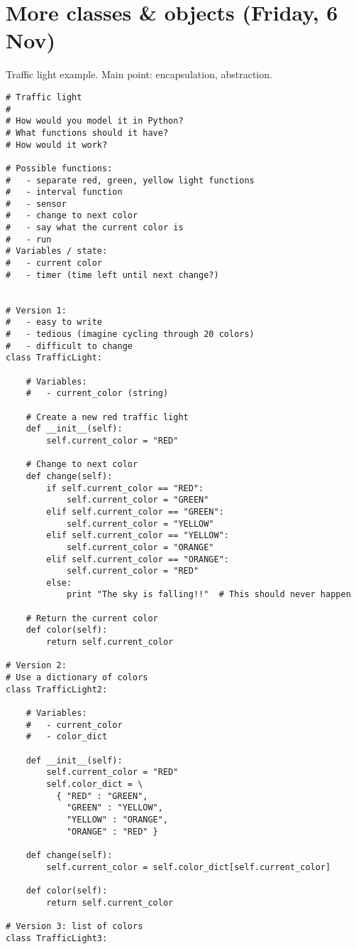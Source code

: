 \documentclass{article}
\begin{document}
\section*{More classes \& objects (Friday, 6 Nov)}

Traffic light example.  Main point: encapsulation, abstraction.

\begin{verbatim}
# Traffic light
#
# How would you model it in Python?
# What functions should it have?
# How would it work?

# Possible functions:
#   - separate red, green, yellow light functions
#   - interval function
#   - sensor
#   - change to next color
#   - say what the current color is
#   - run
# Variables / state:
#   - current color
#   - timer (time left until next change?)


# Version 1:
#   - easy to write
#   - tedious (imagine cycling through 20 colors)
#   - difficult to change
class TrafficLight:

    # Variables:
    #   - current_color (string)

    # Create a new red traffic light
    def __init__(self):
        self.current_color = "RED"

    # Change to next color
    def change(self):
        if self.current_color == "RED":
            self.current_color = "GREEN"
        elif self.current_color == "GREEN":
            self.current_color = "YELLOW"
        elif self.current_color == "YELLOW":
            self.current_color = "ORANGE"
        elif self.current_color == "ORANGE":
            self.current_color = "RED"
        else:
            print "The sky is falling!!"  # This should never happen

    # Return the current color
    def color(self):
        return self.current_color

# Version 2:
# Use a dictionary of colors
class TrafficLight2:

    # Variables:
    #   - current_color
    #   - color_dict

    def __init__(self):
        self.current_color = "RED"
        self.color_dict = \
          { "RED" : "GREEN",
            "GREEN" : "YELLOW",
            "YELLOW" : "ORANGE",
            "ORANGE" : "RED" }

    def change(self):
        self.current_color = self.color_dict[self.current_color]

    def color(self):
        return self.current_color

# Version 3: list of colors
class TrafficLight3:


\end{verbatim}
\end{document}

